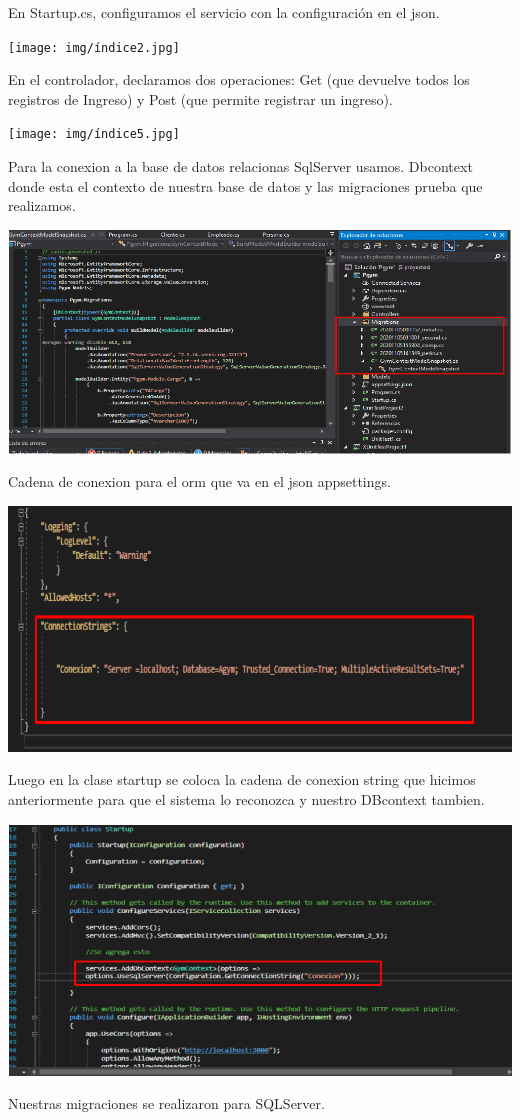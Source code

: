 \documentclass[12pt,letterpaper]{article}
\begin{document}
En Startup.cs, configuramos el servicio con la configuración en el json.

\begin{center}
    \texttt{[image: img/índice2.jpg]}  
\end{center}
\newpage
En el controlador, declaramos dos operaciones: Get (que devuelve todos los registros de Ingreso) y Post (que permite registrar un ingreso).

\begin{center}
    \texttt{[image: img/índice5.jpg]}  
\end{center}

Para la conexion a la base de datos relacionas SqlServer usamos.
Dbcontext donde esta el contexto de nuestra base de datos y las migraciones prueba que
realizamos.
\begin{center}
    \includegraphics[width=14cm]{img/relacional.png}  
\end{center}
\newpage
Cadena de conexion para el orm que va en el json appsettings.
\begin{center}
    \includegraphics[width=14cm]{img/cadenaRelacional.png}  
\end{center}
Luego en la clase startup se coloca la cadena de conexion string que hicimos anteriormente
para que el sistema lo reconozca y nuestro DBcontext tambien.
\begin{center}
    \includegraphics[width=14cm]{img/start.png}  
\end{center}
Nuestras migraciones se realizaron para SQLServer.
\end{document}
